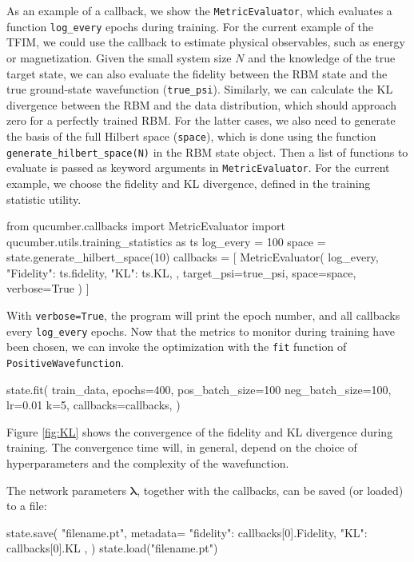 \documentclass[submission, Phys, hidelnks]{SciPost}
\begin{document}
As an example of a callback, we show the \verb|MetricEvaluator|, which evaluates a function \verb|log_every| epochs during training. For the current example of the TFIM, we could use the callback to estimate physical observables, such as energy or magnetization. Given the small system size $N$ and the knowledge of the true target state, we can also evaluate the fidelity between the RBM state and the true ground-state wavefunction (\verb|true_psi|). Similarly, we can calculate the KL divergence between the RBM and the data distribution, which should approach zero for a perfectly trained RBM. For the latter cases, we also need to generate the basis of the full Hilbert space (\verb|space|), which is done using the function \verb|generate_hilbert_space(N)| in the RBM state object. Then a list of functions to evaluate is passed as keyword arguments in \verb|MetricEvaluator|. For the current example, we choose the fidelity and KL divergence, defined in the training statistic utility.
\begin{python}
from qucumber.callbacks import MetricEvaluator
import qucumber.utils.training_statistics as ts
log_every = 100
space = state.generate_hilbert_space(10)
callbacks = [
    MetricEvaluator(
        log_every,
        {
        "Fidelity": ts.fidelity, 
        "KL": ts.KL, 
        },
    target_psi=true_psi,
    space=space,
    verbose=True
    )
]
\end{python}
With \verb|verbose=True|, the program will print the epoch number, and all callbacks every \verb|log_every| epochs. Now that the metrics to monitor during training have been chosen, we can invoke the optimization with the \verb|fit| function of \verb|PositiveWavefunction|.
\begin{python}
state.fit(
    train_data,
    epochs=400,
    pos_batch_size=100
    neg_batch_size=100,
    lr=0.01
    k=5,
    callbacks=callbacks,
)
\end{python}

Figure \ref{fig:KL} shows the convergence of the fidelity and KL divergence during training. The convergence time will, in general, depend on the choice of hyperparameters and the complexity of the wavefunction.

The network parameters $\bm{\lambda}$, together with the callbacks, can be saved (or loaded) to a file:
\begin{python}
state.save(
    "filename.pt",
    metadata={
        "fidelity": callbacks[0].Fidelity,
        "KL": callbacks[0].KL
    },
)
state.load("filename.pt")
\end{python}
\end{document}
